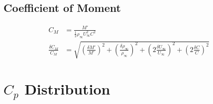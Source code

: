 \documentclass[runningheads]{llncs}
\begin{document}
\subsection{Coefficient of Moment}


\begin{align*}
    C_M &= \frac{M'}{\frac{1}{2}\rho_\infty U^2_\infty C^2} \\
    \frac{\delta C_M}{C_M} &= \sqrt{\left(\frac{\delta M'}{M'}\right)^2 + \left(\frac{\delta\rho_\infty}{\rho_\infty}\right)^2 + \left(2\frac{\delta U_\infty}{U_\infty}\right)^2 +\left(2\frac{\delta C}{C}\right)^2}
\end{align*}

\section{$C_p$ Distribution}\label{app:CP}
\end{document}
